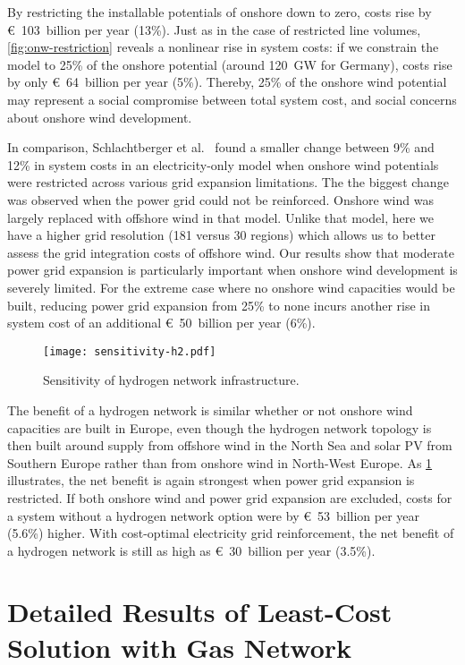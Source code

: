 By restricting the installable potentials of onshore down to zero, costs rise by
\euro~103~billion per year (13\%). Just as in the case of restricted line volumes,
\cref{fig:onw-restriction} reveals a nonlinear rise in system costs: if we
constrain the model to 25\% of the onshore potential (around 120~GW for Germany),
costs rise by only \euro~64~billion per year (5\%). Thereby, 25\% of the onshore
wind potential may represent a social compromise between total system cost, and
social concerns about onshore wind development.

In comparison, Schlachtberger et al.~\cite{schlachtbergerCostOptimal2018} found
a smaller change between 9\% and 12\% in system costs in an electricity-only
model when onshore wind potentials were restricted across various grid expansion
limitations. The the biggest change was observed when the power grid could not
be reinforced. Onshore wind was largely replaced with offshore wind in that
model. Unlike that model, here we have a higher grid resolution (181 versus 30
regions) which allows us to better assess the grid integration costs of offshore
wind. Our results show that moderate power grid expansion is particularly
important when onshore wind development is severely limited. For the extreme
case where no onshore wind capacities would be built, reducing power grid
expansion from 25\% to none incurs another rise in system cost of an additional
\euro~50~billion per year (6\%).

\begin{figure}
    \centering
    \texttt{[image: sensitivity-h2.pdf]}
    \caption{Sensitivity of hydrogen network infrastructure.}
    \label{fig:h2-restriction-w-onw}
\end{figure}

The benefit of a hydrogen network is similar whether or not onshore wind
capacities are built in Europe, even though the hydrogen network topology is
then built around supply from offshore wind in the North Sea and solar PV from
Southern Europe rather than from onshore wind in North-West Europe. As
\cref{fig:h2-restriction-w-onw} illustrates, the net benefit is again strongest
when power grid expansion is restricted. If both onshore wind and power grid
expansion are excluded, costs for a system without a hydrogen network option
were by \euro~53~billion per year (5.6\%) higher. With cost-optimal electricity
grid reinforcement, the net benefit of a hydrogen network is still as high as
\euro~30~billion per year (3.5\%).

\section{Detailed Results of Least-Cost Solution with Gas Network}
\label{sec:si:detailed}

